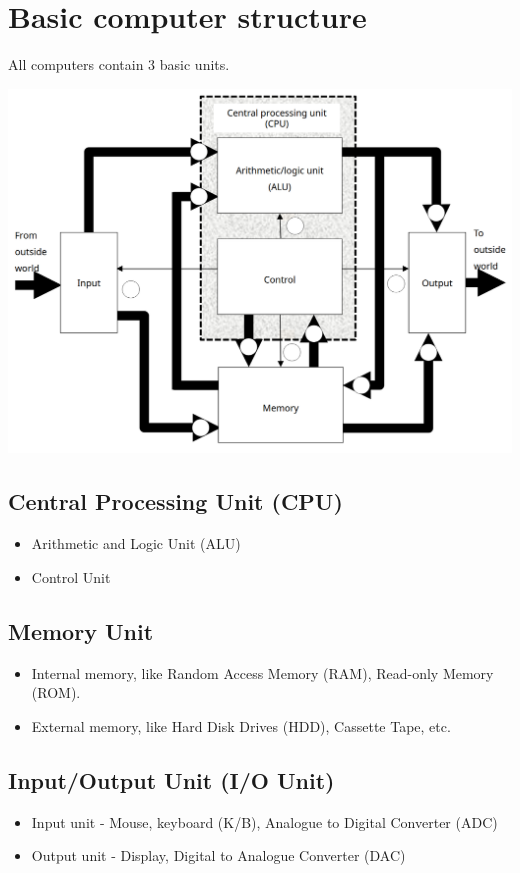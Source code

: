 \documentclass[11pt]{article}
\begin{document}
 \newpage

\section{Basic computer structure}
\label{sec:orga348666}
All computers contain 3 basic units.

\begin{center}
\includegraphics[width=.9\linewidth]{./images/basic-computer-structure.png}
\end{center}

\subsection{Central Processing Unit (CPU)}
\label{sec:org95ff1af}
\begin{itemize}
\item Arithmetic and Logic Unit (ALU)
\item Control Unit
\end{itemize}

\subsection{Memory Unit}
\label{sec:org9566924}
\begin{itemize}
\item Internal memory, like Random Access Memory (RAM), Read-only Memory (ROM).
\item External memory, like Hard Disk Drives (HDD), Cassette Tape, etc.
\end{itemize}

\subsection{Input/Output Unit (I/O Unit)}
\label{sec:org36ede46}
\begin{itemize}
\item Input unit - Mouse, keyboard (K/B), Analogue to Digital Converter (ADC)
\item Output unit - Display, Digital to Analogue Converter (DAC)
\end{itemize}
\end{document}
